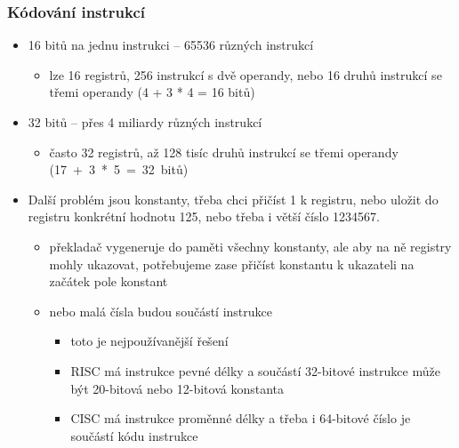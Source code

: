 \begin{frame}
\frametitle{Kódování instrukcí}

\begin{itemize}
\item 16 bitů na jednu instrukci -- 65536 různých instrukcí
\begin{itemize}
\item lze 16 registrů, 256 instrukcí s dvě operandy, nebo 16 druhů instrukcí se třemi operandy (4 + 3 * 4 = 16 bitů)
\end{itemize}
\item 32 bitů -- přes 4 miliardy různých instrukcí 
\begin{itemize}
\item často 32 registrů, až 128 tisíc druhů instrukcí se třemi operandy (17~+~3~*~5~=~32~bitů)
\end{itemize}
\item Další problém jsou konstanty, třeba chci přičíst 1 k registru, nebo uložit do registru konkrétní hodnotu 125, nebo třeba i větší číslo 1234567.
\begin{itemize}
\item překladač vygeneruje do paměti všechny konstanty, ale aby na ně registry mohly ukazovat, potřebujeme zase přičíst konstantu k ukazateli na začátek pole konstant
\item nebo malá čísla budou součástí instrukce
\begin{itemize}
\item toto je nejpoužívanější řešení
\item RISC má instrukce pevné délky a součástí 32-bitové instrukce může být 20-bitová nebo 12-bitová konstanta
\item CISC má instrukce proměnné délky a třeba i 64-bitové číslo je součástí kódu instrukce
\end{itemize}
\end{itemize}
\end{itemize}
\end{frame}


